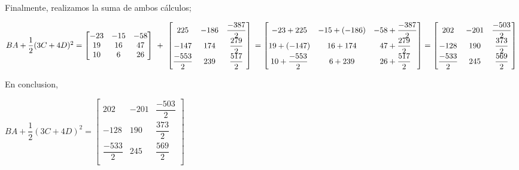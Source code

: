 \documentclass[a4paper,12pt]{article}
\begin{document}
Finalmente, realizamos la suma de ambos cálculos;

$\\\\ BA + \dfrac{1}{2}(3C + 4D)^2 = \left [ \begin{matrix}
	-23 & -15 & -58\\
	 19 &  16 &  47\\
	 10 &   6 &  26\\
\end{matrix}\right ] 
~ + ~ \left [ \begin{matrix}
	 225 & -186 & \dfrac{-387}{2} \\ 
	-147 & 174 & \dfrac{279}{2} \\
	\dfrac{-553}{2} & 239 & \dfrac{517}{2} \\
\end{matrix}\right ]
\\\\\\= \left [ \begin{matrix}
	-23+225 & -15+(-186) & -58+\dfrac{-387}{2} \\
	19+(-147) & 16+174 & 47+\dfrac{279}{2} \\
	10+\dfrac{-553}{2} & 6+239 & 26+\dfrac{517}{2} \\
\end{matrix}\right ] 
= \left [ \begin{matrix}
	202 & -201 & \dfrac{-503}{2} \\
	-128 & 190 & \dfrac{373}{2} \\
	\dfrac{-533}{2} & 245 & \dfrac{569}{2} \\
\end{matrix}\right ] \\\\ $

En conclusion, 

\begin{center}
$BA + \dfrac{1}{2}(3C + 4D)^2  = \left [ \begin{matrix}
	202 & -201 & \dfrac{-503}{2} \\
	-128 & 190 & \dfrac{373}{2} \\
	\dfrac{-533}{2} & 245 & \dfrac{569}{2} \\
\end{matrix}\right ]$
\end{center}
\end{document}

